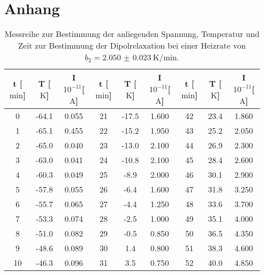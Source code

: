 \newpage
\section{Anhang}

\begin{table}
    \centering
    \caption{Messreihe zur Bestimmung der anliegenden Spannung, \newline Temperatur und Zeit zur Bestimmung der Dipolrelaxation bei einer Heizrate von $b_2 = \SI{2.050(23)}{\kelvin\per\minute}$.} 
    \label{tab:WhoIsBigInJapan?2}
    \begin{tabular}{c c c@{\hskip 0.5cm}||@{\hskip 0.5cm} c c c@{\hskip 0.5cm} ||@{\hskip 0.5cm} c c c}
        \toprule
        t [$\si{\minute}$] & T [$\si{\kelvin}$] &  I $10^{-11}$[$\si{\ampere}$] & t [$\si{\minute}$] & T [$\si{\kelvin}$] &  I $10^{-11}$[$\si{\ampere}$] & t [$\si{\minute}$] & T [$\si{\kelvin}$] &  I $10^{-11}$[$\si{\ampere}$] \\
        \midrule
0    & -64.1   &    0.055 & 21      &  -17.5     &  1.600  &  42  &      23.4  &           1.860 \\
1    & -65.1   &    0.455 & 22      &  -15.2     &  1.950 &  43  &      25.2  &           2.050 \\
2    & -65.0    &    0.040  & 23      &  -13.0       &  2.100  &  44  &      26.9  &           2.300 \\
3    & -63.0     &    0.041 & 24      &  -10.8     &  2.100  &  45  &      28.4  &           2.600  \\
4    & -60.3   &    0.049 & 25      &  -8.9      &  2.000    &  46  &      30.1  &           2.900  \\
5    & -57.8   &    0.055 & 26      &  -6.4      &  1.600  &  47  &      31.8  &           3.250 \\
6    & -55.7   &    0.065 & 27      &  -4.4      &  1.250 &  48  &      33.6  &           3.700  \\
7    & -53.3   &    0.074 & 28      &  -2.5      &  1.000    &  49  &      35.1  &           4.000    \\
8    & -51.0   &    0.082 & 29      &  -0.5      &  0.850 &  50  &      36.5  &           4.350 \\
9    & -48.6   &    0.089 & 30      &  1.4       & 0.800   &  51  &      38.3  &           4.600 \\
10   & -46.3   &    0.096 & 31      &  3.5       & 0.750  &  52  &      40.0    &           4.850 \\

\end{tabular}
\end{table}
